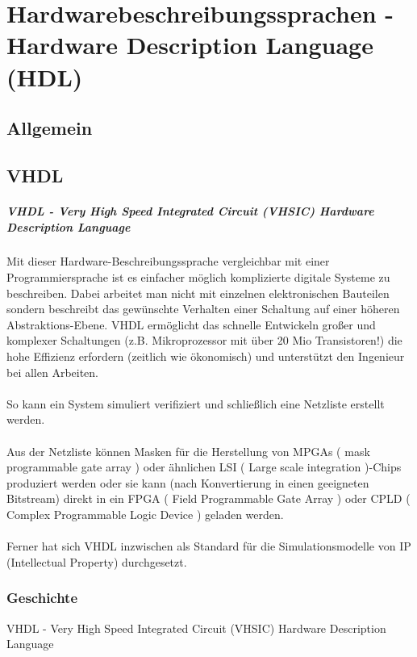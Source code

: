 \chapter{Hardwarebeschreibungssprachen - Hardware Description Language (HDL)}

\section{Allgemein}

\section{VHDL}
\paragraph{VHDL - Very High Speed Integrated Circuit (VHSIC) Hardware Description Language}
Mit dieser Hardware-Beschreibungssprache vergleichbar mit einer Programmiersprache ist es einfacher möglich komplizierte digitale Systeme zu beschreiben. Dabei arbeitet man nicht mit einzelnen elektronischen Bauteilen sondern beschreibt das gewünschte Verhalten einer Schaltung auf einer höheren Abstraktions-Ebene. VHDL ermöglicht das schnelle Entwickeln großer und komplexer Schaltungen (z.B. Mikroprozessor mit über 20 Mio Transistoren!) die hohe Effizienz erfordern (zeitlich wie ökonomisch) und unterstützt den Ingenieur bei allen Arbeiten.\\\\
So kann ein System simuliert verifiziert und schließlich eine Netzliste erstellt werden.\\\\
Aus der Netzliste können Masken für die Herstellung von MPGAs ( mask programmable gate array ) oder ähnlichen LSI ( Large scale integration )-Chips produziert werden oder sie kann (nach Konvertierung in einen geeigneten Bitstream) direkt in ein FPGA ( Field Programmable Gate Array ) oder CPLD ( Complex Programmable Logic Device ) geladen werden.\\\\
Ferner hat sich VHDL inzwischen als Standard für die Simulationsmodelle von IP (Intellectual Property) durchgesetzt.

\subsection{Geschichte}
	VHDL - Very High Speed Integrated Circuit (VHSIC) Hardware Description Language

